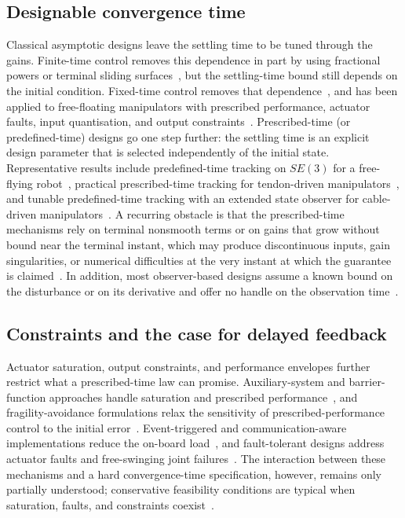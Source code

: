 \subsection{Designable convergence time}
Classical asymptotic designs leave the settling time to be tuned through the gains. Finite-time control removes this dependence in part by using fractional powers or terminal sliding surfaces~\cite{su2020,jia2020finite,shao2021ntsm}, but the settling-time bound still depends on the initial condition. Fixed-time control removes that dependence~\cite{polyakov2012,zuo2019}, and has been applied to free-floating manipulators with prescribed performance, actuator faults, input quantisation, and output constraints~\cite{hu2024constrainedfixed,li2025,hu2025preassigned}. Prescribed-time (or predefined-time) designs go one step further: the settling time is an explicit design parameter that is selected independently of the initial state. Representative results include predefined-time tracking on $SE(3)$ for a free-flying robot~\cite{xu2024se3predefined}, practical prescribed-time tracking for tendon-driven manipulators~\cite{zou2025practical}, and tunable predefined-time tracking with an extended state observer for cable-driven manipulators~\cite{zou2026tunable,xuPredefinedTimeTrackingControl2024}. A recurring obstacle is that the prescribed-time mechanisms rely on terminal nonsmooth terms or on gains that grow without bound near the terminal instant, which may produce discontinuous inputs, gain singularities, or numerical difficulties at the very instant at which the guarantee is claimed~\cite{yan,hu2024constrainedfixed}. In addition, most observer-based designs assume a known bound on the disturbance or on its derivative and offer no handle on the observation time~\cite{yan}.

\subsection{Constraints and the case for delayed feedback}
Actuator saturation, output constraints, and performance envelopes further restrict what a prescribed-time law can promise. Auxiliary-system and barrier-function approaches handle saturation and prescribed performance~\cite{yao2021,zhou2025saturated,tian2024multiple}, and fragility-avoidance formulations relax the sensitivity of prescribed-performance control to the initial error~\cite{zhou2025saturated}. Event-triggered and communication-aware implementations reduce the on-board load~\cite{zhuang2025event}, and fault-tolerant designs address actuator faults and free-swinging joint failures~\cite{li2025,fu2022faulttolerant}. The interaction between these mechanisms and a hard convergence-time specification, however, remains only partially understood; conservative feasibility conditions are typical when saturation, faults, and constraints coexist~\cite{hu2024constrainedfixed,zhou2025saturated}.

